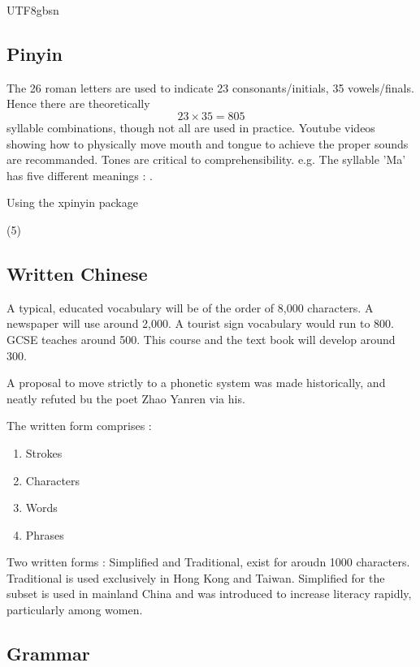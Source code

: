 \documentclass{article}
\newcommand{\myfont}{gbsn} %
\begin{document}
\begin{CJK}{UTF8}{\myfont}
\subsection{Pinyin}

The 26 roman letters are used to indicate 23 consonants/initials, 35 vowels/finals.  Hence there are theoretically $$23\times35=805$$ syllable combinations, though not all are used in practice.   Youtube videos showing how to physically move mouth and tongue to achieve the proper sounds are recommanded.   Tones are critical to comprehensibility.  e.g. The syllable 'Ma' has five different meanings : .

Using the xpinyin package

\begin{tasks}(5)
  \task {}
  \task {}
  \task {}
  \task {}
  \task {}
\end{tasks}

\subsection{Written Chinese}

A typical, educated vocabulary will be of the order of 8,000 characters.  A newspaper will use around 2,000.  A tourist sign vocabulary would run to 800.  GCSE teaches around 500.  This course and the text book will develop around 300.

A proposal to move strictly to a phonetic system was made historically, and neatly refuted bu the poet Zhao Yanren via his.

The written form comprises :

\begin{enumerate}
\item Strokes
\item Characters
\item Words
\item Phrases
\end{enumerate}

Two written forms : Simplified and Traditional, exist for aroudn 1000 characters.  Traditional is used exclusively in Hong Kong and Taiwan.  Simplified for the subset is used in mainland China and was introduced to increase literacy rapidly, particularly among women.

\subsection{Grammar}


\end{CJK}
\end{document}
